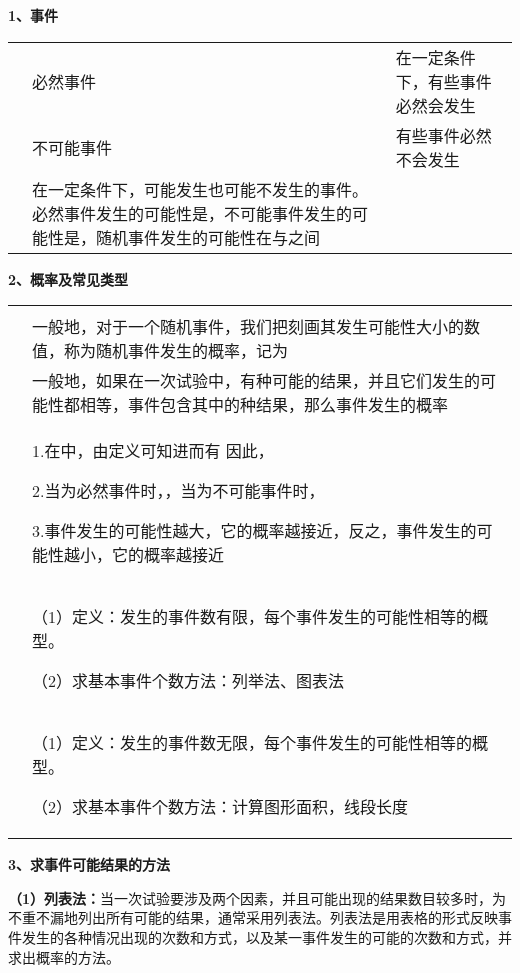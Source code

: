 \documentclass[a4paper,11pt,UTF8]{ctexart}
\begin{document}
\textbf{1、事件}

\begin{longtable}[]{@{}lll@{}}
\toprule
\endhead
& 必然事件 & 在一定条件下，有些事件必然会发生\tabularnewline
& 不可能事件 & 有些事件必然不会发生\tabularnewline
&
在一定条件下，可能发生也可能不发生的事件。必然事件发生的可能性是，不可能事件发生的可能性是，随机事件发生的可能性在与之间
&\tabularnewline
\bottomrule
\end{longtable}

\textbf{2、概率及常见类型}

\begin{longtable}[]{@{}ll@{}}
\toprule
\endhead
&\tabularnewline
&
一般地，对于一个随机事件，我们把刻画其发生可能性大小的数值，称为随机事件发生的概率，记为\tabularnewline
&
一般地，如果在一次试验中，有种可能的结果，并且它们发生的可能性都相等，事件包含其中的种结果，那么事件发生的概率\tabularnewline
\begin{minipage}[t]{0.47\columnwidth}\raggedright
\strut
\end{minipage} & \begin{minipage}[t]{0.47\columnwidth}\raggedright
1.在中，由定义可知进而有 因此，

2.当为必然事件时，，当为不可能事件时，

3.事件发生的可能性越大，它的概率越接近，反之，事件发生的可能性越小，它的概率越接近\strut
\end{minipage}\tabularnewline
\begin{minipage}[t]{0.47\columnwidth}\raggedright
\strut
\end{minipage} & \begin{minipage}[t]{0.47\columnwidth}\raggedright
（1）定义：发生的事件数有限，每个事件发生的可能性相等的概型。

（2）求基本事件个数方法：列举法、图表法\strut
\end{minipage}\tabularnewline
\begin{minipage}[t]{0.47\columnwidth}\raggedright
\strut
\end{minipage} & \begin{minipage}[t]{0.47\columnwidth}\raggedright
（1）定义：发生的事件数无限，每个事件发生的可能性相等的概型。

（2）求基本事件个数方法：计算图形面积，线段长度\strut
\end{minipage}\tabularnewline
\bottomrule
\end{longtable}

\textbf{3、求事件可能结果的方法}

\textbf{（1）列表法：}当一次试验要涉及两个因素，并且可能出现的结果数目较多时，为不重不漏地列出所有可能的结果，通常采用列表法。列表法是用表格的形式反映事件发生的各种情况出现的次数和方式，以及某一事件发生的可能的次数和方式，并求出概率的方法。
\end{document}
